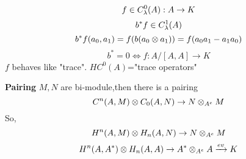 \begin{example}
$$f\in C_{\lambda}^0(A):A\to K$$
$$b^*f\in C^1_{\lambda}(A)$$
$$b^*f(a_0,a_1)=f(b(a_0\otimes a_1))=f(a_0a_1-a_1a_0)$$
$$b^*=0\iff f:A/[A,A]\to K$$
$f$ behaves like "trace".
$HC^0(A)$="trace operators"
\end{example}

\textbf{Pairing}
$M,N$ are bi-module,then there is a pairing
$$C^n(A,M)\otimes C_0(A,N)\to N\otimes_{A^e}M$$
So,
$$H^n(A,M)\otimes H_n(A,N)\to N\otimes_{A^e}M$$
$$H^n(A,A^*)\otimes H_n(A,A)\to A^*\otimes_{A^e}A\xrightarrow{ev}K$$















